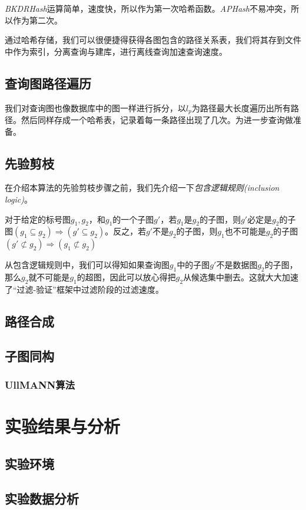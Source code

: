 \documentclass{XDBAthesis}
\numberwithin{algorithm}{chapter}
\begin{document}
\emph{BKDRHash}运算简单，速度快，所以作为第一次哈希函数。\emph{APHash}不易冲突，所以作为第二次。

通过哈希存储，我们可以很便捷得获得各图包含的路径关系表，我们将其存到文件中作为索引，分离查询与建库，进行离线查询加速查询速度。

\subsection{查询图路径遍历}
我们对查询图也像数据库中的图一样进行拆分，以$l_p $为路径最大长度遍历出所有路径。然后同样存成一个哈希表，记录着每一条路径出现了几次。为进一步查询做准备。
\subsection{先验剪枝}
    在介绍本算法的先验剪枝步骤之前，我们先介绍一下\emph{包含逻辑规则(inclusion logic)}。
    \begin{defn}
        对于给定的标号图$g_1 ,g_2 $，和$g_1 $的一个子图$g'$，若$g_1 $是$g_2 $的子图，则$g'$必定是$g_2 $的子图$(g_1 \subseteq g_2 ) \Rightarrow (g' \subseteq g_2  )$。反之，若$g'$不是$g_2 $的子图，则$g_1 $也不可能是$g_2 $的子图$(g' \not\subset g_2  )\Rightarrow (g_1 \not\subset g_2 )$    
    \end{defn}
    从包含逻辑规则中，我们可以得知如果查询图$g_1 $中的子图$g'$不是数据图$g_2 $的子图，那么$g_2 $就不可能是$g_1 $的超图，因此可以放心得把$g_2 $从候选集中删去。这就大大加速了“过滤-验证”框架中过滤阶段的过滤速度。
    

\subsection{路径合成}
\subsection{子图同构}
\subsubsection{UllMANN算法}


\section{实验结果与分析}
\subsection{实验环境}
\subsection{实验数据分析}


\ifx\allfiles\undefined


\end{document}
